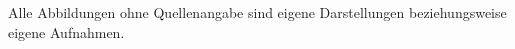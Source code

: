 \listoffigures

Alle Abbildungen ohne Quellenangabe sind eigene Darstellungen beziehungsweise eigene Aufnahmen.
\newpage

\listoftables
\newpage

\renewcommand{\theHsection}{arabicsection.\thesection}
\renewcommand\thesection{\arabic{section}}
\setcounter{section}{0}

\setcounter{page}{1}

\clearpage

\clearpage

\clearpage

\clearpage

\clearpage

\clearpage

\clearpage



\appendix



\begingroup
\raggedright
\sloppy
\printbibliography
\endgroup

\newpage


\newpage



